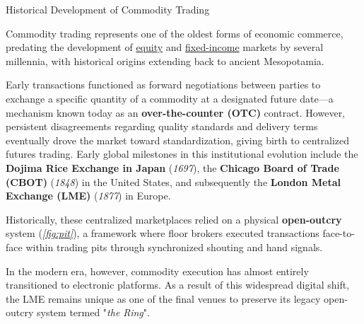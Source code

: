 \documentclass[10pt]{article}
\begin{document}
  \begin{core}{Historical Development of Commodity Trading}

    Commodity trading represents one of the oldest forms of economic commerce, predating the development of \href{https://ibahng.github.io/finance_markets/equity/equity.pdf}{equity} and \href{https://ibahng.github.io/finance_markets/fixed_income/fixed_income.pdf}{fixed-income} markets by several millennia, with historical origins extending back to ancient Mesopotamia.

    Early transactions functioned as forward negotiations between parties to exchange a specific quantity of a commodity at a designated future date---a mechanism known today as an \textbf{over-the-counter (OTC)} contract. However, persistent disagreements regarding quality standards and delivery terms eventually drove the market toward standardization, giving birth to centralized futures trading. Early global milestones in this institutional evolution include the \textbf{Dojima Rice Exchange in Japan} (\textit{1697}), the \textbf{Chicago Board of Trade (CBOT)} (\textit{1848}) in the United States, and subsequently the \textbf{London Metal Exchange (LME)} (\textit{1877}) in Europe.

    Historically, these centralized marketplaces relied on a physical \textbf{open-outcry} system (\textit{\autoref{fig:pit}}), a framework where floor brokers executed transactions face-to-face within trading pits through synchronized shouting and hand signals.


    In the modern era, however, commodity execution has almost entirely transitioned to electronic platforms. As a result of this widespread digital shift, the LME remains unique as one of the final venues to preserve its legacy open-outcry system termed "\textit{the Ring}".

  \end{core}
\end{document}
